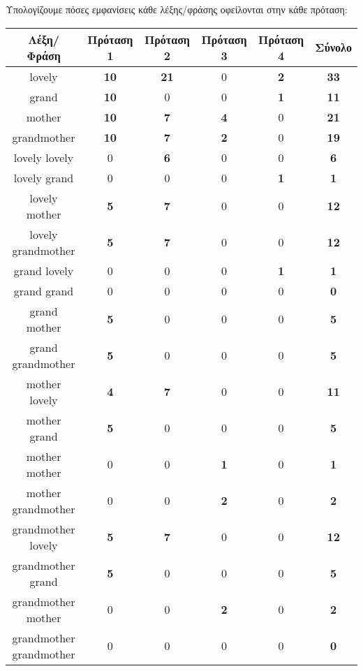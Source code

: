 \documentclass[12pt,a4paper]{article}
\begin{document}
			Υπολογίζουμε πόσες εμφανίσεις κάθε λέξης/φράσης οφείλονται στην κάθε πρόταση: \\
			
			\begin{tabular}{|c|c|c|c|c||c|}
				\hline
				\textbf{Λέξη/Φράση} & \textbf{Πρόταση 1} & \textbf{Πρόταση 2} & \textbf{Πρόταση 3} & \textbf{Πρόταση 4} & \textbf{Σύνολο} \\
				\hline
				\hline
				lovely & \textbf{10} & \textbf{21} & 0 & \textbf{2} & \textbf{33} \\
				\hline
				grand & \textbf{10} & 0 & 0 & \textbf{1} & \textbf{11} \\
				\hline
				mother & \textbf{10} & \textbf{7} & \textbf{4} & 0 & \textbf{21} \\
				\hline
				grandmother & \textbf{10} & \textbf{7} & \textbf{2} & 0 & \textbf{19} \\
				\hline
				
				lovely lovely & 0 & \textbf{6} & 0 & 0 & \textbf{6} \\
				\hline
				lovely grand & 0 & 0 & 0 & \textbf{1} & \textbf{1} \\
				\hline
				lovely mother & \textbf{5} & \textbf{7} & 0 & 0 & \textbf{12} \\
				\hline
				lovely grandmother & \textbf{5} & \textbf{7} & 0 & 0 & \textbf{12} \\
				\hline
				
				grand lovely & 0 & 0 & 0 & \textbf{1} & \textbf{1} \\
				\hline
				grand grand & 0 & 0 & 0 & 0 & \textbf{0} \\
				\hline
				grand mother & \textbf{5} & 0 & 0 & 0 & \textbf{5} \\
				\hline
				grand grandmother & \textbf{5} & 0 & 0 & 0 & \textbf{5} \\
				\hline
				
				mother lovely & \textbf{4} & \textbf{7} & 0 & 0 & \textbf{11} \\
				\hline
				mother grand & \textbf{5} & 0 & 0 & 0 & \textbf{5} \\
				\hline
				mother mother & 0 & 0 & \textbf{1} & 0 & \textbf{1} \\
				\hline
				mother grandmother & 0 & 0 & \textbf{2} & 0 & \textbf{2} \\
				\hline
				
				grandmother lovely & \textbf{5} & \textbf{7} & 0 & 0 & \textbf{12} \\
				\hline
				grandmother grand & \textbf{5} & 0 & 0 & 0 & \textbf{5} \\
				\hline
				grandmother mother & 0 & 0 & \textbf{2} & 0 & \textbf{2} \\
				\hline
				grandmother grandmother & 0 & 0 & 0 & 0 & \textbf{0} \\
				\hline
			\end{tabular}
			 
\end{document}
